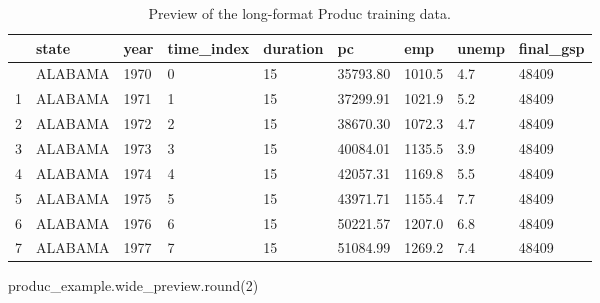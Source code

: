 \documentclass[
  letterpaper,
  DIV=11,
  numbers=noendperiod]{scrartcl}
\newenvironment{Shaded}{\begin{snugshade}}{\end{snugshade}}
\newcommand{\BuiltInTok}[1]{\textcolor[rgb]{0.00,0.23,0.31}{#1}}
\newcommand{\DecValTok}[1]{\textcolor[rgb]{0.68,0.00,0.00}{#1}}
\newcommand{\NormalTok}[1]{\textcolor[rgb]{0.00,0.23,0.31}{#1}}
\begin{document}
\begin{longtable}[]{@{}lllllllll@{}}

\caption{\label{tbl-produc-long-preview}Preview of the long-format
Produc training data.}

\tabularnewline

\toprule\noalign{}
& state & year & time\_index & duration & pc & emp & unemp &
final\_gsp \\
\midrule\noalign{}
\endhead
\bottomrule\noalign{}
\endlastfoot
0 & ALABAMA & 1970 & 0 & 15 & 35793.80 & 1010.5 & 4.7 & 48409 \\
1 & ALABAMA & 1971 & 1 & 15 & 37299.91 & 1021.9 & 5.2 & 48409 \\
2 & ALABAMA & 1972 & 2 & 15 & 38670.30 & 1072.3 & 4.7 & 48409 \\
3 & ALABAMA & 1973 & 3 & 15 & 40084.01 & 1135.5 & 3.9 & 48409 \\
4 & ALABAMA & 1974 & 4 & 15 & 42057.31 & 1169.8 & 5.5 & 48409 \\
5 & ALABAMA & 1975 & 5 & 15 & 43971.71 & 1155.4 & 7.7 & 48409 \\
6 & ALABAMA & 1976 & 6 & 15 & 50221.57 & 1207.0 & 6.8 & 48409 \\
7 & ALABAMA & 1977 & 7 & 15 & 51084.99 & 1269.2 & 7.4 & 48409 \\

\end{longtable}

\begin{Shaded}
\begin{Highlighting}[]
\NormalTok{produc\_example.wide\_preview.}\BuiltInTok{round}\NormalTok{(}\DecValTok{2}\NormalTok{)}
\end{Highlighting}
\end{Shaded}
\end{document}
